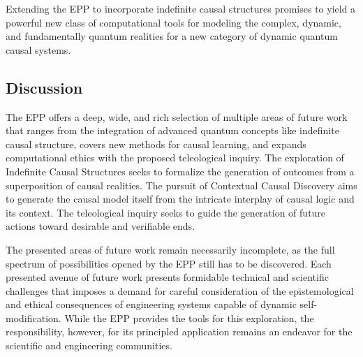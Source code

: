 Extending the EPP to incorporate indefinite causal structures promises to yield a powerful new class of computational tools for modeling the complex, dynamic, and fundamentally quantum realities for a new category of dynamic quantum causal systems.  
  
  \subsection{Discussion}

The EPP offers a deep, wide, and rich selection of multiple areas of future work that ranges from the integration of advanced quantum concepts like indefinite causal structure, covers new methods for causal learning, and expands  computational ethics with the proposed teleological inquiry. The exploration of Indefinite Causal Structures seeks to formalize the generation of outcomes from a superposition of causal realities. The pursuit of Contextual Causal Discovery aims to generate the causal model itself from the intricate interplay of causal logic and its context. The teleological inquiry seeks to guide the generation of future actions toward desirable and verifiable ends. 

The presented areas of future work remain necessarily incomplete, as the full spectrum of possibilities opened by the EPP still has to be discovered. Each presented avenue of future work presents formidable technical and scientific challenges that imposes a demand for careful consideration of the epistemological and ethical consequences of engineering systems capable of dynamic self-modification. While the EPP provides the tools for this exploration, the responsibility, however, for its principled application remains an endeavor for the scientific and engineering communities.


\newpage
